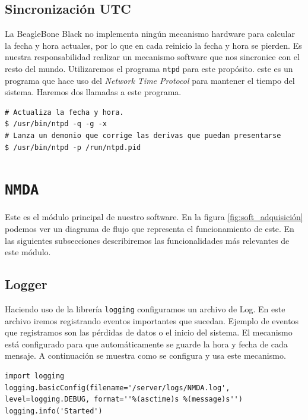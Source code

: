	\subsection{Sincronización UTC}
		La BeagleBone Black no implementa ningún mecanismo hardware para calcular la fecha y hora actuales, por lo que en cada reinicio la
		fecha y hora se pierden. Es nuestra responsabilidad realizar un mecanismo software que nos sincronice con el resto del
		mundo\cite{ntpd}.  Utilizaremos el programa \texttt{ntpd} para este propósito. este es un programa que hace uso del \emph{Network Time
		Protocol}\cite{ntpWiki} para mantener el tiempo del sistema. Haremos dos llamadas a este programa.
		\begin{lstlisting}[style=myBash]
# Actualiza la fecha y hora.
$ /usr/bin/ntpd -q -g -x
# Lanza un demonio que corrige las derivas que puedan presentarse
$ /usr/bin/ntpd -p /run/ntpd.pid
		\end{lstlisting}


\section{\texttt{NMDA}}
	Este es el módulo principal de nuestro software. En la figura \ref{fig:soft_adquisición} podemos ver un diagrama de flujo que representa el
	funcionamiento de este. En las siguientes subsecciones describiremos las funcionalidades más relevantes de este módulo.
	\subsection{Logger}
		Haciendo uso de la librería \texttt{logging}\cite{py_logging} configuramos un archivo de Log. En este archivo iremos registrando eventos importantes
		que sucedan. Ejemplo de eventos que registramos son las pérdidas de datos o el inicio del sistema. El mecanismo está configurado para
		que automáticamente se guarde la hora y fecha de cada mensaje. A continuación se muestra como se configura y usa este mecanismo.
		\begin{lstlisting}[style=myPython]
import logging
logging.basicConfig(filename='/server/logs/NMDA.log', level=logging.DEBUG, format=''%(asctime)s %(message)s'')
logging.info('Started')
		\end{lstlisting}
